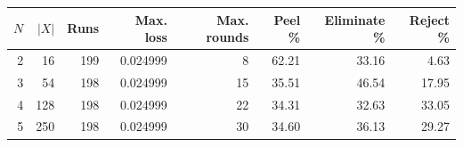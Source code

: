 \begin{center}\small
\begin{tabular}{rrrrrrrr}
\toprule
$N$ & $|X|$ & Runs & Max. loss & Max. rounds & Peel \% & Eliminate \% & Reject \%\\
\midrule
2 & 16 & 199 & 0.024999 & 8 & 62.21 & 33.16 & 4.63\\
3 & 54 & 198 & 0.024999 & 15 & 35.51 & 46.54 & 17.95\\
4 & 128 & 198 & 0.024999 & 22 & 34.31 & 32.63 & 33.05\\
5 & 250 & 198 & 0.024999 & 30 & 34.60 & 36.13 & 29.27\\
\bottomrule
\end{tabular}
\end{center}
